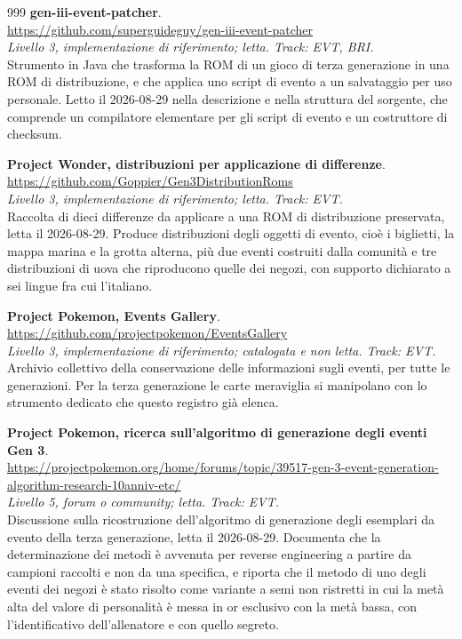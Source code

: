 \begin{thebibliography}{999}
  \textbf{gen-iii-event-patcher}.
  \\ \url{https://github.com/superguideguy/gen-iii-event-patcher}
  \\ \emph{Livello 3, implementazione di riferimento; letta. Track: EVT, BRI.}
  \\ Strumento in Java che trasforma la ROM di un gioco di terza generazione in una ROM di distribuzione, e che applica uno script di evento a un salvataggio per uso personale. Letto il 2026-08-29 nella descrizione e nella struttura del sorgente, che comprende un compilatore elementare per gli script di evento e un costruttore di checksum.

  \textbf{Project Wonder, distribuzioni per applicazione di differenze}.
  \\ \url{https://github.com/Goppier/Gen3DistributionRoms}
  \\ \emph{Livello 3, implementazione di riferimento; letta. Track: EVT.}
  \\ Raccolta di dieci differenze da applicare a una ROM di distribuzione preservata, letta il 2026-08-29. Produce distribuzioni degli oggetti di evento, cioè i biglietti, la mappa marina e la grotta alterna, più due eventi costruiti dalla comunità e tre distribuzioni di uova che riproducono quelle dei negozi, con supporto dichiarato a sei lingue fra cui l'italiano.

  \textbf{Project Pokemon, Events Gallery}.
  \\ \url{https://github.com/projectpokemon/EventsGallery}
  \\ \emph{Livello 3, implementazione di riferimento; catalogata e non letta. Track: EVT.}
  \\ Archivio collettivo della conservazione delle informazioni sugli eventi, per tutte le generazioni. Per la terza generazione le carte meraviglia si manipolano con lo strumento dedicato che questo registro già elenca.

  \textbf{Project Pokemon, ricerca sull'algoritmo di generazione degli eventi Gen 3}.
  \\ \url{https://projectpokemon.org/home/forums/topic/39517-gen-3-event-generation-algorithm-research-10anniv-etc/}
  \\ \emph{Livello 5, forum o community; letta. Track: EVT.}
  \\ Discussione sulla ricostruzione dell'algoritmo di generazione degli esemplari da evento della terza generazione, letta il 2026-08-29. Documenta che la determinazione dei metodi è avvenuta per reverse engineering a partire da campioni raccolti e non da una specifica, e riporta che il metodo di uno degli eventi dei negozi è stato risolto come variante a semi non ristretti in cui la metà alta del valore di personalità è messa in or esclusivo con la metà bassa, con l'identificativo dell'allenatore e con quello segreto.


\end{thebibliography}
